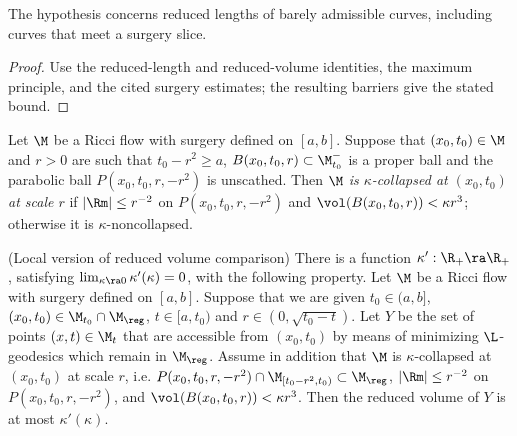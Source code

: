 \begin{remark}
\label{rem:kl-reduced-l-geometry-structural-remark-reduced-length}

The hypothesis concerns reduced lengths of barely admissible curves, including curves that meet a surgery slice.
\end{remark}

\begin{proof}
\sketch Use the reduced-length and reduced-volume identities, the maximum principle, and the cited surgery estimates; the resulting barriers give the stated bound.
\end{proof}

\begin{definition}
  \label{def:kl-reduced-l-geometry-kappa-noncollapsing}

\label{surgerycollapsedef}
Let $\M$ be a Ricci flow with surgery defined on $[a,b]$. Suppose that
$(x_0,t_0)\in\M$ and $r>0$ are such that $t_0-r^2\geq a$,
$B(x_0,t_0,r)\subset\M_{t_0}^-$ is a proper ball
and the parabolic ball $P(x_0,t_0,r,-r^2)$ is unscathed.
Then {\em $\M$ is $\kappa$-collapsed at $(x_0,t_0)$ at scale
$r$} if $|\Rm|\leq r^{-2}$ on $P(x_0,t_0,r,-r^2)$ and
$\vol(B(x_0,t_0,r))<\kappa r^3$; otherwise it is $\kappa$-noncollapsed.
\end{definition}

\begin{lemma}
  \label{lem:kl-reduced-l-geometry-existence-reduced-volume}
(Local version of reduced volume comparison)
\label{localreducedvolume}
There is a function $\kappa':\R_+\ra \R_+$, satisfying
$\lim_{\kappa\ra 0}\kappa'(\kappa)=0$, with the following property.
Let $\M$ be a Ricci flow with surgery defined on $[a,b]$. Suppose
that we are given $t_0\in (a,b]$,
$(x_0,t_0)\in \M_{t_0}\cap \M_{\reg}$, $t\in [a,t_0)$ and
$r \in (0,\sqrt{t_0-t})$.  Let $Y$ be the set of points $(x,t)\in \M_t$
that are accessible from $(x_0,t_0)$ by means of minimizing $\L$-geodesics
which remain in $\M_{\reg}$.  Assume
in addition that
$\M$ is $\kappa$-collapsed at $(x_0,t_0)$ at scale $r$, i.e.
$P(x_0,t_0,r,-r^2) \cap \M_{[t_0 - r^2, t_0)} \subset\M_{\reg}$,
$|\Rm|\leq r^{-2}$ on
$P(x_0,t_0,r,-r^2)$, and $\vol(B(x_0,t_0,r))<\kappa r^3$.
Then  the reduced volume of $Y$ is at most
$\kappa'(\kappa)$.
\end{lemma}

